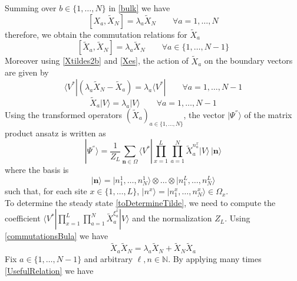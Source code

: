 \documentclass[10pt]{article}
\numberwithin{equation}{section}
\numberwithin{equation}{subsection}
\newcommand{\Xt}{\widetilde{X}}
\begin{document}
Summing over $b\in \{1,\ldots,N\}$ in \eqref{bulk} we have
\begin{equation} 
	\left[X_{a},\Xt_{N}\right]=\lambda_{a}\Xt_{N}\qquad\forall a=1,\ldots,N
\end{equation}
therefore, we obtain the commutation relations for $\Xt_{a}$ 
\begin{equation}\label{commutationsBula}
	\left[\Xt_{a},\Xt_{N}\right]=\lambda_{a}\Xt_{N}\qquad \forall a\in \{1,\ldots,N-1\}
\end{equation}
Moreover using \eqref{Xtildes2b} and \eqref{Xes}, the action of $\Xt_{a}$ on the boundary vectors are given by 
\begin{equation}\label{commLEFT}
	\langle V^{*}|\left(\lambda_{a}\Xt_{N}-\Xt_{a}\right)=\lambda_{a}\langle V^{*}|\qquad\forall a=1,\ldots,N-1
\end{equation}
\begin{equation}\label{commRIGHT}
	\Xt_{a} |V\rangle= \lambda_{a}|V\rangle\qquad\forall a=1,\ldots,N-1
\end{equation} 
Using the transformed operators $(\widetilde{X}_{a})_{a\in\{1,\ldots,N\}}$, the vector $|\Psi^{''}\rangle$ of the matrix product ansatz is written as
\begin{equation}\label{toDetermineTilde}
	|\Psi^{''}\rangle = \frac{1}{Z_{L}}\sum_{\bm{n}\in \Omega}\langle V^{*}|\prod_{x=1}^{L}\prod_{a=1}^{N}\widetilde{X}_{a}^{n_{a}^{x}}
	|V \rangle \,|\bm{n}\rangle
\end{equation}
where the basis is 
$$
|\bm{n}\rangle =|n_{1}^{1},\ldots,n_{N}^{1}\rangle \otimes \ldots\otimes |n_{1}^{L},\ldots,n_{N}^{L}\rangle
$$
such that, for each site $x\in \{1,\ldots,L\}$, $|n^{x}\rangle=|n_{1}^{x},\ldots,n_{N}^{x}\rangle\in \Omega_{x}$. \\
To determine the steady state \eqref{toDetermineTilde}, we need to compute the coefficient $\langle V^{*}|\prod_{x=1}^{L}\prod_{a=1}^{N}\widetilde{X}_{a}^{\xi_{a}^{x}}
|V \rangle$ and the normalization $Z_{L}$. Using \eqref{commutationsBula} we have
\begin{equation}\label{UsefulRelation}
	\widetilde{X}_{a}\widetilde{X}_{N}=\lambda_{a}\widetilde{X}_{N}+\widetilde{X}_{N}\widetilde{X}_{a}
\end{equation}
Fix $ a\in \{1,\ldots,N-1\}$ and arbitrary $ \ell,n\in \mathbb{N}$. By applying many times \eqref{UsefulRelation} we have
\end{document}
